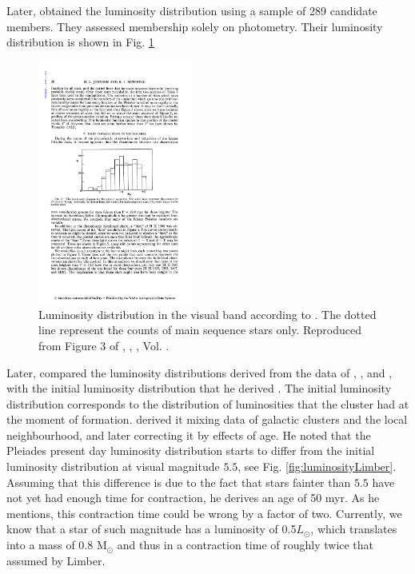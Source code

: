 Later, \citet{Johnson1958} obtained the luminosity distribution using a sample of 289 candidate members. They assessed  membership solely on photometry. Their luminosity distribution is shown in Fig. \ref{fig:luminosityJohnson}

\begin{figure}[ht!]
\begin{center}
\includegraphics[height=8cm]{background/Figures/F3_Johnson1958.pdf}
\caption{Luminosity distribution in the visual band according to \citet{Johnson1958}. The dotted line represent the counts of main sequence stars only. Reproduced from Figure 3 of \citet{Johnson1958}, \textit{}, , Vol. .}
\label{fig:luminosityJohnson}
\end{center}
\end{figure}

Later, \citet{Limber1962} compared the luminosity distributions derived from the data of \citet{Trumpler1921}, \citet{Hertzsprung1947}, and \citet{Johnson1958}, with the initial luminosity distribution that he derived \citep{Limber1960}. The initial luminosity distribution corresponds to the distribution of luminosities that the cluster had at the moment of formation. \citet{Limber1960} derived it mixing data of galactic clusters and the local neighbourhood, and later correcting it by effects of age. He noted that the Pleiades present day luminosity distribution starts to differ from the initial luminosity distribution at visual magnitude $5.5$, see Fig. \ref{fig:luminosityLimber}. Assuming that this difference is due to the fact that stars fainter than $5.5$ have not yet had enough time for contraction, he derives an age of 50 \gls{myr}. As he mentions, this contraction time could be wrong by a factor of two. Currently, we know that a star of such magnitude has a luminosity of 0.5$L_{\odot}$, which translates into a mass of 0.8 M$_{\odot}$ and thus in a contraction time of roughly twice that assumed by Limber.

